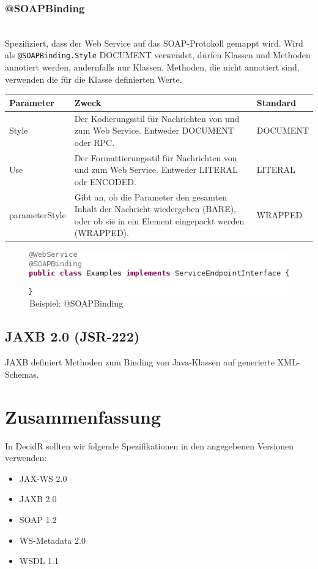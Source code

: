 \documentclass[runningheads]{llncs}
\newcommand{\germanquote}[1]{\glqq{}#1\grqq{}}
\newcommand{\decidr}{DecidR}
\newcommand{\anntabwidth}{\textwidth}
\begin{document}
    \subsubsection{@SOAPBinding}\ \\
      Spezifiziert, dass der Web Service auf das SOAP-Protokoll gemappt wird. Wird als \texttt{@SOAPBinding.Style} \germanquote{DOCUMENT} verwendet, dürfen Klassen und Methoden annotiert werden, andernfalls nur Klassen. Methoden, die nicht annotiert sind, verwenden die für die Klasse definierten Werte. \\
    \tymin=75pt
    \begin{tabulary}{\anntabwidth}{|l|L|L|}
    \hline
    \textbf{Parameter} & \textbf{Zweck} & \textbf{Standard} \\
    \hline
      Style &
      Der Kodierungsstil für Nachrichten von und zum Web Service. Entweder \germanquote{DOCUMENT} oder \germanquote{RPC}. &
      DOCUMENT \\
    \hline
      Use &
      Der Formattierungsstil für Nachrichten von und zum Web Service. Entweder \germanquote{LITERAL} odr \germanquote{ENCODED}. &
      LITERAL \\
    \hline
      parameterStyle &
      Gibt an, ob die Parameter den gesamten Inhalt der Nachricht wiedergeben (\germanquote{BARE}), oder ob sie in ein Element eingepackt werden (\germanquote{WRAPPED}). &
      WRAPPED \\
    \hline
    \end{tabulary} \vfill
    \tymin=10pt
    \begin{figure}[tbh]
      \centering
      \includegraphics[width=\textwidth]{../images/AtSOAPBinding.png}
      \caption{Beispiel: @SOAPBinding}
      \label{fig:soapb}
    \end{figure} \vfill


  \label{jsr222}
  \subsection{JAXB 2.0 (JSR-222)}
  JAXB\cite{jsr_222} definiert Methoden zum Binding von Java-Klassen auf generierte XML-Schemas.

  \label{summary}
  \section{Zusammenfassung}
    In \decidr{} sollten wir folgende Spezifikationen in den angegebenen Versionen verwenden:
    \begin{itemize}
      \item JAX-WS 2.0
      \item JAXB 2.0
      \item SOAP 1.2
      \item WS-Metadata 2.0
      \item WSDL 1.1
    \end{itemize}


  \newpage

  \newpage
  \begin{flushleft}
    
    
  \end{flushleft}
\end{document}
